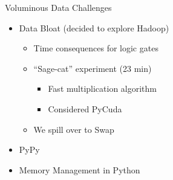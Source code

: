 \documentclass[dvips,11pt]{beamer}
\newcommand{\lsb}[1]{\text{{\scriptsize LSB}}\left( {#1} \right)}
\begin{document}

\begin{frame}{ Voluminous Data Challenges }


  \begin{itemize}
    \item Data Bloat (decided to explore Hadoop)
      \begin{itemize}
      \item Time consequences for logic gates
      \item ``Sage-cat'' experiment (23 min)
        \begin{itemize}
        \item Fast multiplication algorithm
        \item Considered PyCuda
        \end{itemize}
      \item We spill over to Swap
      \end{itemize}
    \item PyPy 
    \item Memory Management in Python
  \end{itemize}
  
  
\end{frame}
\end{document}
